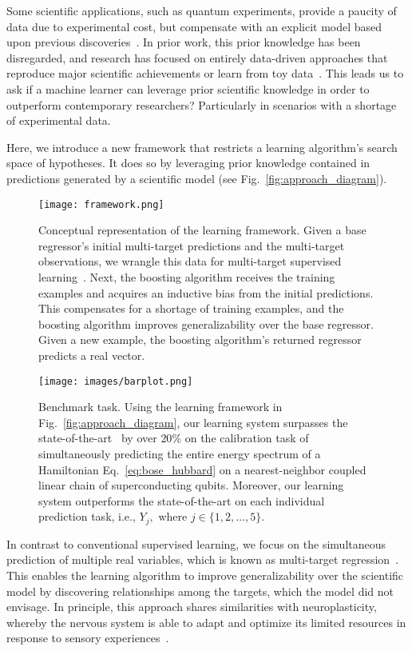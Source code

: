 \documentclass[aps,twocolumn,superscriptaddress,floatfix,preprintnumbers,showkeys]{revtex4}
\begin{document}
Some scientific applications, such as quantum experiments, provide a paucity of data due to experimental cost, but compensate with an explicit model based upon previous discoveries~\cite{Brunton_2016, Roushan_2017, Butler_2018, Neill_2018, Chiaro_2019}. In prior work, this prior knowledge has been disregarded, and research has focused on entirely data-driven approaches that reproduce major scientific achievements or learn from toy data~\cite{Schmidt_2009, Carrasquilla_2017, Melnikov_2018, Koch-Janusz_2018, Torlai_2018, Wu_2019, Iten_2020, Wetzel_2020}. This leads us to ask if a machine learner can leverage prior scientific knowledge in order to outperform contemporary researchers? Particularly in scenarios with a shortage of experimental data.

Here, we introduce a new framework that restricts a learning algorithm's search space of hypotheses. It does so by leveraging prior knowledge contained in predictions generated by a scientific model (see Fig.~\ref{fig:approach_diagram}). 
\begin{figure*}
\centering
\begin{minipage}{\columnwidth}
\centering
\texttt{[image: framework.png]}
\caption{Conceptual representation of the learning framework. Given a base regressor's initial multi-target predictions and the multi-target observations, we wrangle this data for multi-target supervised learning~\cite{Borchani_2015, Waegeman_2019}. Next, the boosting algorithm receives the training examples and acquires an inductive bias from the initial predictions. This compensates for a shortage of training examples, and the boosting algorithm improves generalizability over the base regressor. Given a new example, the boosting algorithm's returned regressor predicts a real vector.}
\label{fig:approach_diagram}
\end{minipage}\hfill
\begin{minipage}{\columnwidth}
\centering
\texttt{[image: images/barplot.png]} 
\caption{Benchmark task. Using the learning framework in Fig.~\ref{fig:approach_diagram}, our learning system surpasses the state-of-the-art~\cite{Roushan_2017, Neill_2018, Chiaro_2019} by over $20\%$ on the calibration task of simultaneously predicting the entire energy spectrum of a Hamiltonian Eq.~\ref{eq:bose_hubbard} on a nearest-neighbor coupled linear chain of superconducting qubits. Moreover, our learning system outperforms the state-of-the-art on each individual prediction task, i.e., $Y_{j},$ where $j \in \{1,2,\dots,5\}.$}
\label{fig:test_data_mae}
\end{minipage}
\end{figure*}
In contrast to conventional supervised learning, we focus on the simultaneous prediction of multiple real variables, which is known as multi-target regression~\cite{Caruana_1997, Sklearn_2011, Borchani_2015, Waegeman_2019}. This enables the learning algorithm to improve generalizability over the scientific model by discovering relationships among the targets, which the model did not envisage. In principle, this approach shares similarities with neuroplasticity, whereby the nervous system is able to adapt and optimize its limited resources in response to sensory experiences~\cite{Pascual_leone_2005}. 
\end{document}
